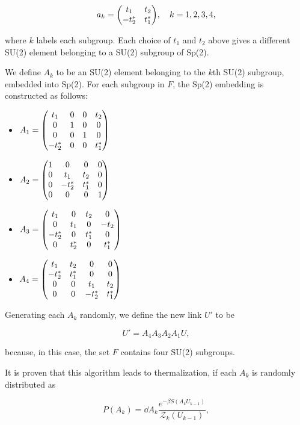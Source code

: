 \documentclass[reqno,12pt]{article}
\numberwithin{equation}{section}
\begin{document}
\begin{equation} \label{eq:su2element}
	a_k = \mqty(t_1 & t_2 \\ -t_2^* & t_1^*) \qc k = 1, 2, 3, 4,
\end{equation}

where $k$ labels each subgroup. 
Each choice of $t_1$ and $t_2$ above gives a different SU(2) element belonging to a SU(2) subgroup of Sp(2).

We define $A_k$ to be an SU(2) element belonging to the $k$th SU(2) subgroup, embedded into Sp(2). For each subgroup in $F$,
the Sp(2) embedding is constructed as follows:
\begin{itemize}
	\item $A_1 = \mqty(
		t_1 & 0 & 0 & t_2 \\
		0 & 1 & 0 & 0 \\
		0 & 0 & 1 & 0 \\
		-t^*_2 & 0 & 0 & t^*_1 
		)$
	\item $A_2 = \mqty(
		1 & 0 & 0 & 0 \\
		0 & t_1 & t_2 & 0 \\
		0 & -t^*_2 & t^*_1 & 0 \\
		0 & 0 & 0 & 1 
		)$
	\item $A_3 = \mqty(
		t_1 & 0 & t_2 & 0 \\
		0 & t_1 & 0 & -t_2 \\
		-t_2^* & 0 & t^*_1 & 0 \\
		0 & t^*_2 & 0 & t^*_1 
		)$
	\item $A_4 = \mqty(
		t_1 & t_2 & 0 & 0 \\
		-t^*_2 & t^*_1 & 0 & 0 \\
		0 & 0 & t_1 & t_2  \\
		0 & 0 & -t^*_2 & t^*_1 
		)$
\end{itemize}

Generating each $A_k$ randomly, we define the new link $U'$ to be

\begin{equation}
	U' = A_4 A_3 A_2 A_1 U,
\end{equation}

because, in this case, the set $F$ contains four SU(2) subgroups.

It is proven \cite{cabibbo} that this algorithm leads to thermalization, if each $A_k$ is randomly distributed as

\begin{equation} \label{eq:probdist}
	P(A_k) = \dd{A_k} \frac{e^{-\beta S(A_k U_{k-1})}}{\mathcal{Z}_k(U_{k-1})},
\end{equation}
\end{document}
